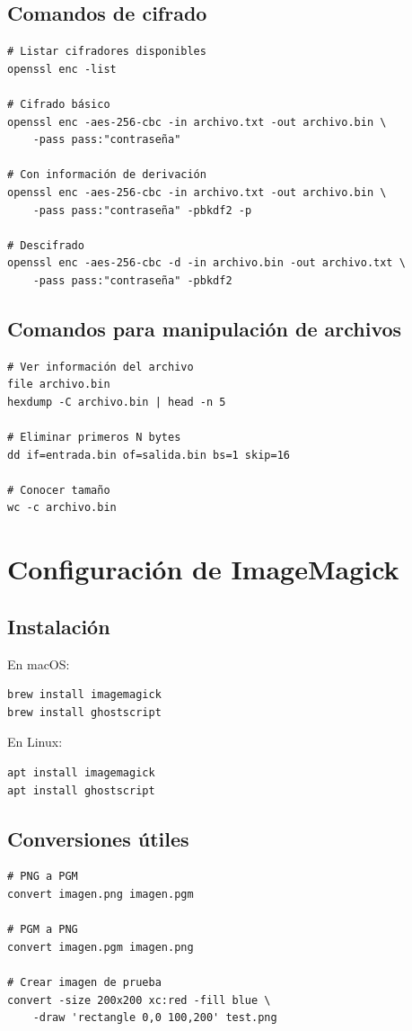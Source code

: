 \documentclass[12pt,a4paper]{report}
\begin{document}
\section{Comandos de cifrado}

\begin{lstlisting}[caption=Comandos para cifrado simétrico]
# Listar cifradores disponibles
openssl enc -list

# Cifrado básico
openssl enc -aes-256-cbc -in archivo.txt -out archivo.bin \
    -pass pass:"contraseña"

# Con información de derivación
openssl enc -aes-256-cbc -in archivo.txt -out archivo.bin \
    -pass pass:"contraseña" -pbkdf2 -p

# Descifrado
openssl enc -aes-256-cbc -d -in archivo.bin -out archivo.txt \
    -pass pass:"contraseña" -pbkdf2
\end{lstlisting}

\section{Comandos para manipulación de archivos}

\begin{lstlisting}[caption=Comandos útiles]
# Ver información del archivo
file archivo.bin
hexdump -C archivo.bin | head -n 5

# Eliminar primeros N bytes
dd if=entrada.bin of=salida.bin bs=1 skip=16

# Conocer tamaño
wc -c archivo.bin
\end{lstlisting}

\chapter{Configuración de ImageMagick}

\section{Instalación}

En macOS:
\begin{lstlisting}
brew install imagemagick
brew install ghostscript
\end{lstlisting}

En Linux:
\begin{lstlisting}
apt install imagemagick
apt install ghostscript
\end{lstlisting}

\section{Conversiones útiles}

\begin{lstlisting}[caption=Conversiones de imagen]
# PNG a PGM
convert imagen.png imagen.pgm

# PGM a PNG
convert imagen.pgm imagen.png

# Crear imagen de prueba
convert -size 200x200 xc:red -fill blue \
    -draw 'rectangle 0,0 100,200' test.png
\end{lstlisting}
\end{document}
